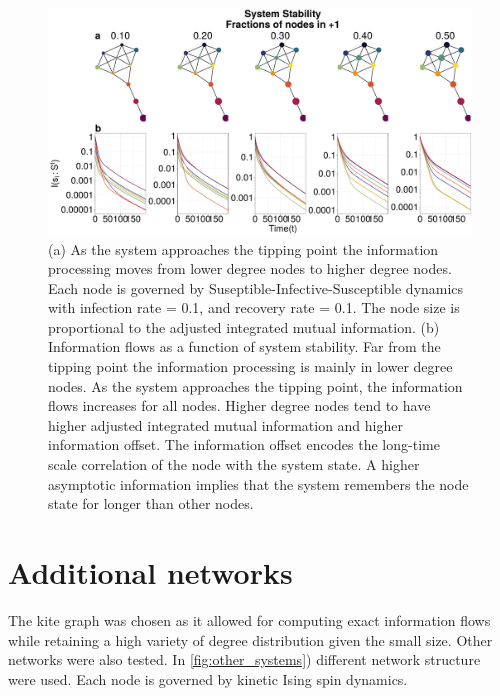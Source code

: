 \documentclass[a4paper, 11pt, twocolumn]{article}
\begin{document}
\begin{figure}[hbt]
\centering
\includegraphics[width=.9\linewidth]{./figures/sis_kite_graph.pdf}
\caption{\label{fig:kite_res_sis}(a) As the system approaches the tipping point the information processing moves from lower degree  nodes to higher degree nodes. Each node is governed by Suseptible-Infective-Susceptible dynamics with infection rate = 0.1, and recovery rate = 0.1. The node size is proportional to the adjusted integrated mutual information. (b) Information flows as a function of system stability. Far from the tipping point the information processing is mainly in lower degree nodes. As the system approaches the tipping point, the information flows increases for all nodes. Higher degree nodes tend to have higher adjusted integrated mutual information and higher information offset. The information offset encodes the long-time scale correlation of the node with the system state. A higher asymptotic information implies that the system remembers the node state for longer than other nodes.}
\end{figure}

\section{Additional networks}
The kite graph was chosen as it allowed for computing exact information flows while retaining a high variety of degree distribution given the small size. Other networks were also tested. In \cref{fig:other_systems}) different network structure were used. Each node is governed by kinetic Ising spin dynamics.
\end{document}
